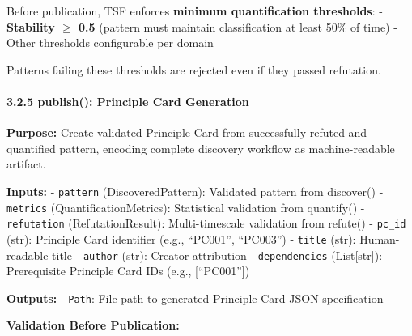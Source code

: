 \documentclass[
]{article}
\begin{document}
Before publication, TSF enforces \textbf{minimum quantification
thresholds}: - \textbf{Stability $\geq$ 0.5} (pattern must maintain
classification at least 50\% of time) - Other thresholds configurable
per domain

Patterns failing these thresholds are rejected even if they passed
refutation.

\paragraph{3.2.5 publish(): Principle Card
Generation}\label{publish-principle-card-generation}

\textbf{Purpose:} Create validated Principle Card from successfully
refuted and quantified pattern, encoding complete discovery workflow as
machine-readable artifact.

\textbf{Inputs:} - \texttt{pattern} (DiscoveredPattern): Validated
pattern from discover() - \texttt{metrics} (QuantificationMetrics):
Statistical validation from quantify() - \texttt{refutation}
(RefutationResult): Multi-timescale validation from refute() -
\texttt{pc\_id} (str): Principle Card identifier (e.g., ``PC001'',
``PC003'') - \texttt{title} (str): Human-readable title -
\texttt{author} (str): Creator attribution - \texttt{dependencies}
(List{[}str{]}): Prerequisite Principle Card IDs (e.g., {[}``PC001''{]})

\textbf{Outputs:} - \texttt{Path}: File path to generated Principle Card
JSON specification

\textbf{Validation Before Publication:}
\end{document}
